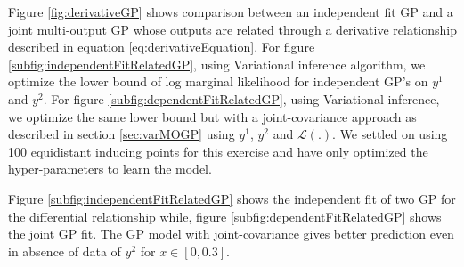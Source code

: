 Figure \ref{fig:derivativeGP} shows comparison between an independent fit GP and a joint multi-output GP whose outputs are related through a derivative relationship described in equation \ref{eq:derivativeEquation}. For figure \ref{subfig:independentFitRelatedGP}, using Variational inference algorithm, we optimize the lower bound of log marginal likelihood for independent GP's on \(y^{1}\) and \(y^{2}\). For figure \ref{subfig:dependentFitRelatedGP}, using Variational inference, we optimize the same lower bound but with a joint-covariance approach as described in section \ref{sec:varMOGP} using \(y^{1}\), \(y^{2}\) and \(\mathcal{L}(.)\). We settled on using 100 equidistant inducing points for this exercise \cite{icpram16Ankit} and have only optimized the hyper-parameters to learn the model. 

Figure \ref{subfig:independentFitRelatedGP} shows the independent fit of two GP for the differential relationship while, figure \ref{subfig:dependentFitRelatedGP} shows the joint GP fit. The GP model with joint-covariance gives better prediction even in absence of data of \(y^{2}\) for \(x \in [0, 0.3]\).

